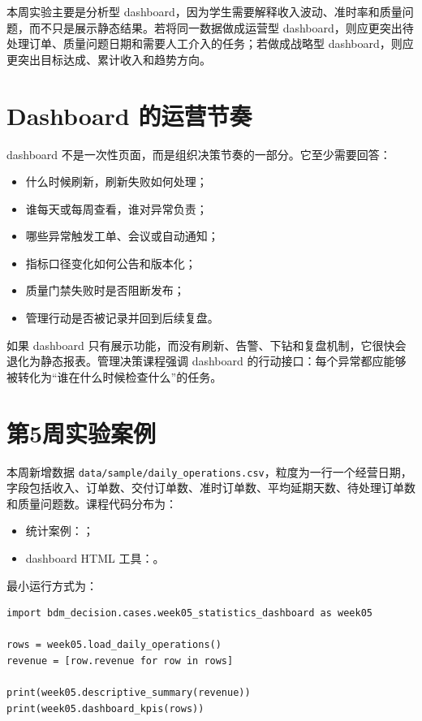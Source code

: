 \documentclass[UTF8,fontset=fandol,openany,zihao=-4]{ctexbook}
\begin{document}
本周实验主要是分析型 dashboard，因为学生需要解释收入波动、准时率和质量问题，而不只是展示静态结果。若将同一数据做成运营型 dashboard，则应更突出待处理订单、质量问题日期和需要人工介入的任务；若做成战略型 dashboard，则应更突出目标达成、累计收入和趋势方向。

\section{Dashboard 的运营节奏}

dashboard 不是一次性页面，而是组织决策节奏的一部分。它至少需要回答：
\begin{itemize}
  \item 什么时候刷新，刷新失败如何处理；
  \item 谁每天或每周查看，谁对异常负责；
  \item 哪些异常触发工单、会议或自动通知；
  \item 指标口径变化如何公告和版本化；
  \item 质量门禁失败时是否阻断发布；
  \item 管理行动是否被记录并回到后续复盘。
\end{itemize}

如果 dashboard 只有展示功能，而没有刷新、告警、下钻和复盘机制，它很快会退化为静态报表。管理决策课程强调 dashboard 的行动接口：每个异常都应能够被转化为“谁在什么时候检查什么”的任务。

\section{第5周实验案例}

本周新增数据 \texttt{data/sample/daily\_operations.csv}，粒度为一行一个经营日期，字段包括收入、订单数、交付订单数、准时订单数、平均延期天数、待处理订单数和质量问题数。课程代码分布为：
\begin{itemize}
  \item 统计案例：；
  \item dashboard HTML 工具：。
\end{itemize}

最小运行方式为：
\begin{lstlisting}[style=pythonstyle,caption={运行第5周统计摘要}]
import bdm_decision.cases.week05_statistics_dashboard as week05

rows = week05.load_daily_operations()
revenue = [row.revenue for row in rows]

print(week05.descriptive_summary(revenue))
print(week05.dashboard_kpis(rows))
\end{lstlisting}
\end{document}
